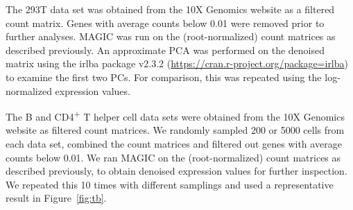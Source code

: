 \documentclass[10pt,letterpaper]{article}
\begin{document}
The 293T data set was obtained from the 10X Genomics website as a filtered count matrix.
Genes with average counts below 0.01 were removed prior to further analyses.
MAGIC was run on the (root-normalized) count matrices as described previously.
An approximate PCA was performed on the denoised matrix using the irlba package v2.3.2 (\url{https://cran.r-project.org/package=irlba}) to examine the first two PCs.
For comparison, this was repeated using the log-normalized expression values.

The B and CD4\textsuperscript{+} T helper cell data sets were obtained from the 10X Genomics website as filtered count matrices.
We randomly sampled 200 or 5000 cells from each data set, combined the count matrices and filtered out genes with average counts below 0.01.
We ran MAGIC on the (root-normalized) count matrices as described previously, to obtain denoised expression values for further inspection.
We repeated this 10 times with different samplings and used a representative result in Figure~\ref{fig:tb}.



\end{document}
